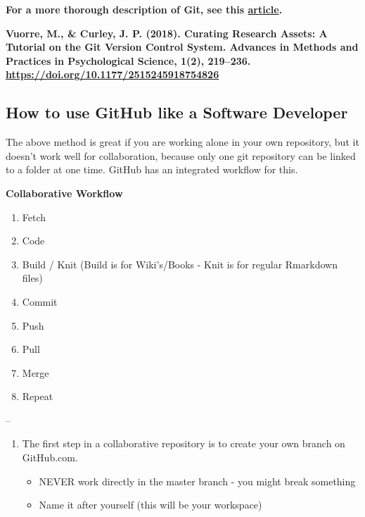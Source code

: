 \documentclass[]{book}
\providecommand{\tightlist}{%
  \setlength{\itemsep}{0pt}\setlength{\parskip}{0pt}}
\begin{document}
\textbf{For a more thorough description of Git, see this \href{https://vuorre.netlify.app/publication/2018/06/01/curating-research-assets-a-tutorial-on-the-git-version-control-system/vuorre-curating-research-assets-2018.pdf}{article}.}

\textbf{Vuorre, M., \& Curley, J. P. (2018). Curating Research Assets: A Tutorial on the Git Version Control System. Advances in Methods and Practices in Psychological Science, 1(2), 219--236. \url{https://doi.org/10.1177/2515245918754826}}

\hypertarget{how-to-use-github-like-a-software-developer}{%
\subsection{How to use GitHub like a Software Developer}\label{how-to-use-github-like-a-software-developer}}

The above method is great if you are working alone in your own repository, but it doesn't work well for collaboration, because only one git repository can be linked to a folder at one time. GitHub has an integrated workflow for this.

\textbf{Collaborative Workflow}

\begin{enumerate}
\def\labelenumi{\arabic{enumi}.}
\tightlist
\item
  Fetch
\item
  Code
\item
  Build / Knit (Build is for Wiki's/Books - Knit is for regular Rmarkdown files)
\item
  Commit
\item
  Push
\item
  Pull
\item
  Merge
\item
  Repeat
\end{enumerate}

--

\begin{enumerate}
\def\labelenumi{\arabic{enumi}.}
\tightlist
\item
  The first step in a collaborative repository is to create your own branch on GitHub.com.

  \begin{itemize}
  \tightlist
  \item
    NEVER work directly in the master branch - you might break something
  \item
    Name it after yourself (this will be your workspace)
  \end{itemize}
\end{enumerate}
\end{document}
